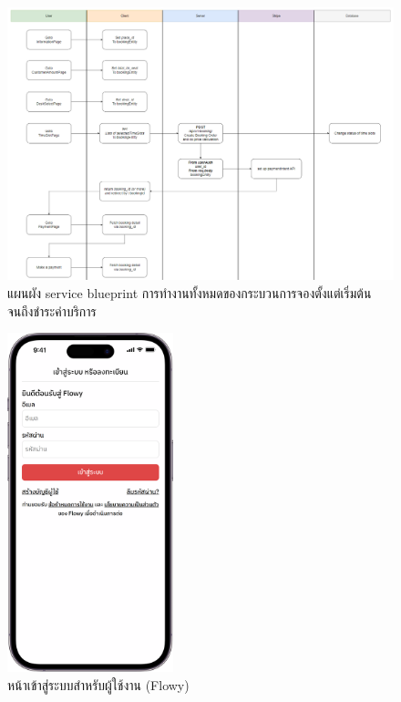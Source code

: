 \begin{landscape}
    \begin{figure}[ht]
        \begin{center}
        \includegraphics[width=7in]{./image/service_blueprint.png}
        \end{center}
        \caption[Payment service blueprint]{แผนผัง service blueprint การทำงานทั้งหมดของกระบวนการจองตั้งแต่เริ่มต้นจนถึงชำระค่าบริการ}
        \label{fig:service_blueprint}
    \end{figure}
\end{landscape}
\begin{figure}[t]
    \begin{center}
    \includegraphics[width=1.9in]{./image/Flowy_login.png}
    \end{center}
    \caption[Flowy login]{หน้าเข้าสู่ระบบสำหรับผู้ใช้งาน (Flowy)}
    \label{fig:Flowy_login}
\end{figure}
